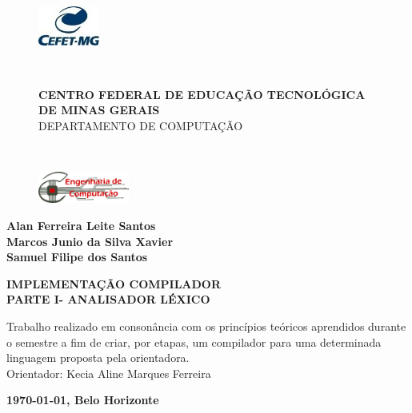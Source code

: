 \thispagestyle{empty}
\begin{center}


\begin{figure}
    \centering
    \hspace{-2.5cm}\begin{minipage}{.1\textwidth}
        \includegraphics[width=2cm]{img/cefet.jpg}
        \end{minipage}\
    \hspace{0.75cm}
	\begin{minipage}{.8\textwidth}
	    \centering \large \textbf{\footnotesize{CENTRO FEDERAL DE EDUCAÇÃO TECNOLÓGICA DE MINAS GERAIS}}\\ \large{DEPARTAMENTO DE COMPUTAÇÃO}
        \end{minipage}\
    \hspace{0.45cm}
    \begin{minipage}{0.1\textwidth}
        \includegraphics[width=3cm]{img/decom.png}
        \end{minipage}
\end{figure}


    \vspace{15mm}
    
    \begin{Large}
        \textbf{ Alan Ferreira Leite Santos \\ Marcos Junio da Silva Xavier \\ Samuel Filipe dos Santos }    
    \end{Large}
    \vspace{4cm}
    
    
    \uppercase{\textbf{\Large Implementação Compilador \\Parte I-   Analisador Léxico}}
\end{center}

\vspace{6cm}

\begin{flushright}
    \begin{minipage}{20em}%
        Trabalho realizado em consonância com os princípios teóricos aprendidos durante o semestre a fim de criar, por etapas, um compilador para uma determinada linguagem proposta pela  orientadora.\\
        Orientador: Kecia Aline Marques Ferreira

    \end{minipage}

\end{flushright}


\vfill
\begin{center}
    \textbf{\large \monthyeardate\today, Belo Horizonte}
\end{center}
\clearpage

